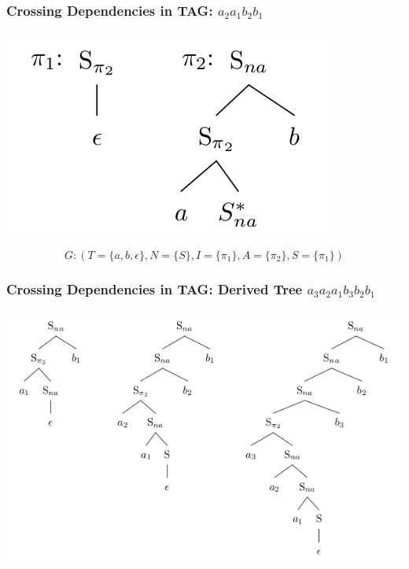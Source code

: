 \documentclass[compress,color=usenames]{beamer}
\begin{document}
\begin{frame}
\frametitle{Crossing Dependencies in TAG: $a_2a_1b_2b_1$}

\begin{center}
\includegraphics[scale=.4]{pics/pic2-4.jpg}
\end{center}

$$G : (T = \{a, b,\epsilon \}, N = \{S \}, I = \{\pi_1\}, A = \{\pi_2\}, S = \{\pi_1\})$$

\end{frame}

\begin{frame}
\frametitle{Crossing Dependencies in TAG: Derived Tree $a_3a_2a_1b_3b_2b_1$}

\begin{center}
\includegraphics[scale=.4]{pics/pic2-5.jpg}
\end{center}


\end{frame}
\end{document}
